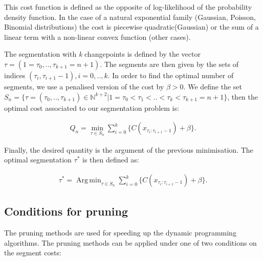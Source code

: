 \documentclass[a4paper,12pt]{article}
\DeclareMathOperator*{\argmin}{Arg\,min}
\begin{document}
	 	This cost function is defined as the opposite of log-likelihood of the probability density function. In the case of a natural exponential family (Gaussian, Poisson, Binomial distributions) the cost is piecewise quadratic(Gaussian) or the sum of a linear term with a non-linear convex function (other cases).
	 	
		The segmentation with \textit{k} changepoints is defined by the vector $\tau =(1 = \tau_0,..,\tau_{k+1} = n+1)$. The segments are then given by the sets of indices $(\tau_i, \tau_{i+1}-1), i = 0,..,k$. In order  to find the optimal number of segments, we use a penalised version of the cost by $\beta > 0$. We define the set $ S_n = \{ \tau = ( \tau_0,..,\tau_{k+1} ) \in \mathbb{N}^{k+2} | 1 =\tau_0 <\tau_1 < .. < \tau_k<\tau_{k+1} = n+1 \}  $, then the optimal cost associated to our segmentation problem is:
			
		\begin{equation}
			\begin{gathered}
				Q_n = \min_{\tau \in S_n} \sum_{i=0}^{k} \{C(x_{\tau_i:\tau_{i+1}-1})+\beta\}.
			\end{gathered}
			\label{eq:cost2}
		\end{equation}
		
		Finally, the desired quantity is the argument of the previous minimisation. The optimal segmentation $\tau^*$ is then defined as:
	 
		\begin{equation}
			\begin{gathered}
			\tau^* = \argmin_{\tau \in S_n} \sum_{i=0}^{k} \{C(x_{\tau_i:\tau_{i+1}-1})+\beta\}.
			\end{gathered}
			\label{eq:tau}
		\end{equation}
		
		\subsection{Conditions for pruning}
		\label{Conditions}
		
		 The pruning methods are used for speeding up the dynamic programming algorithms. The pruning methods can be applied under one of two conditions on the segment costs:
		 
\end{document}
